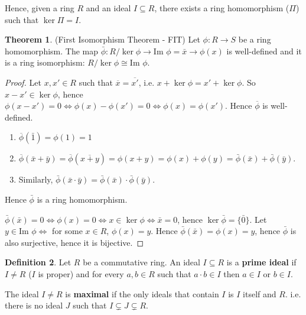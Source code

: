 \documentclass[12pt,a4paper]{article}
\theoremstyle{definition}
\newtheorem{definition}{Definition}[subsection]
\newtheorem{theorem}[definition]{Theorem}
\begin{document}
Hence, given a ring $R$ and an ideal $I \subseteq R$, there exists a ring homomorphism ($\Pi$) such that $\ker \Pi = I$.

\begin{theorem}
	(First Isomorphism Theorem - FIT) Let $\phi: R \rightarrow S$ be a ring homomorphism. The map $\bar{\phi}: R / \ker \phi \rightarrow \text{Im } \phi = \bar{x} \rightarrow \phi(x)$ is well-defined and it is a ring isomorphism: $R / \ker \phi \cong \text{Im } \phi$.
\end{theorem}

\begin{proof}
	Let $x, x' \in R$ such that $\overline{x} = \overline{x'}$, i.e. $x + \ker \phi = x' + \ker \phi$. So $x - x' \in \ker \phi$, hence $\phi(x - x') = 0 \Leftrightarrow \phi(x) - \phi(x') = 0 \Leftrightarrow \phi(x) = \phi(x')$. Hence $\overline{\phi}$ is well-defined.

	\begin{enumerate}
		\item $\overline{\phi}(\bar{1}) = \phi(1) = 1$
		\item $\overline{\phi}(\bar{x} + \bar{y}) = \overline{\phi}(\overline{x + y}) = \phi(x + y) = \phi(x) + \phi(y) = \bar{\phi}(\bar{x}) + \bar{\phi}(\bar{y})$.
		\item Similarly, $\bar{\phi}(\bar{x}\cdot \bar{y}) = \bar{\phi}(\bar{x}) \cdot \bar{\phi}(\bar{y})$.
	\end{enumerate}

	Hence $\bar{\phi}$ is a ring homomorphism.

	$\bar{\phi}(\bar{x}) = 0 \Leftrightarrow \phi(x) = 0 \Leftrightarrow x \in \ker \phi \Leftrightarrow \bar{x} = 0$, hence $\ker \bar{\phi} = \{\bar{0}\}$.
	Let $y \in \text{Im } \phi \Leftrightarrow$ for some $x \in R$, $\phi(x) = y$. Hence $\bar{\phi}(\bar{x}) = \phi(x) = y$, hence $\bar{\phi}$ is also surjective, hence it is bijective.
\end{proof}

\begin{definition}
	Let $R$ be a commutative ring. An ideal $I \subseteq R$ is a \textbf{prime ideal} if $I \ne R$ ($I$ is proper) and for every $a, b \in R$ such that $a \cdot b \in I$ then $a \in I$ or $b \in I$.

	The ideal $I \ne R$ is \textbf{maximal} if the only ideals that contain $I$ is $I$ itself and $R$. i.e. there is no ideal $J$ such that $I \subsetneq J \subsetneq R$.
\end{definition}
\end{document}
